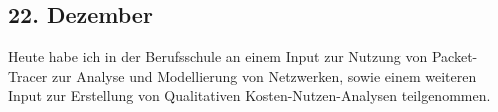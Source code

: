 \subsection{22. Dezember}
Heute habe ich in der Berufsschule an einem Input zur Nutzung von Packet-Tracer zur Analyse und Modellierung von Netzwerken, sowie einem weiteren Input zur Erstellung von Qualitativen Kosten-Nutzen-Analysen teilgenommen. 